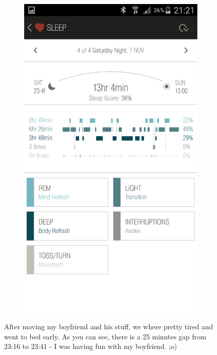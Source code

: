 \documentclass[12pt,a4paper]{article}
\begin{document}
\begin{figure}[H]
\begin{subfigure}[b]{0.5\textwidth}
        \includegraphics[width=\textwidth]{07-11-15-4.png}
    \end{subfigure}
\caption{After moving my boyfriend and his stuff, we where pretty tired and went to bed early. As you can see, there is a 25 minutes gap from 23:16 to 23:41 - I was having fun with my boyfriend. ;o)}
\end{figure}

\newpage
\end{document}
